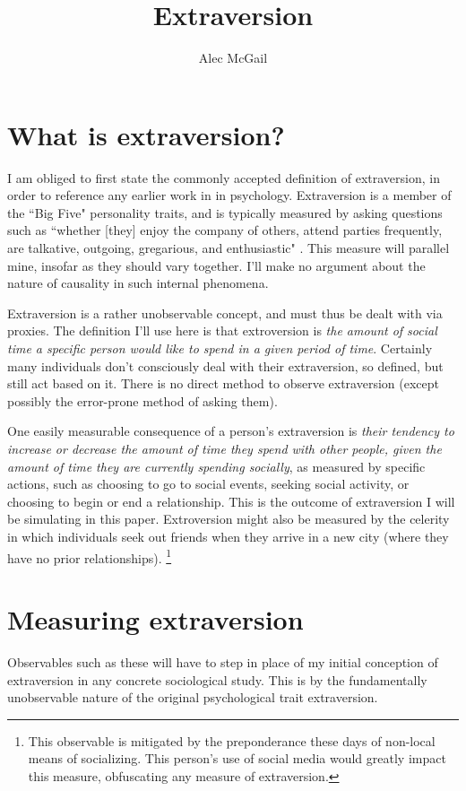 \documentclass[]{article}
\title{Extraversion}
\author{Alec McGail}
\begin{document}
	\maketitle
	
	\section{What is extraversion?}
	I am obliged to first state the commonly accepted definition of extraversion, in order to reference any earlier work in in psychology. Extraversion is a member of the ``Big Five" personality traits, and is typically measured by asking questions such as ``whether [they] enjoy the company of others, attend parties	frequently, are talkative, outgoing, gregarious, and enthusiastic" \cite{Gosling2003}. This measure will parallel mine, insofar as they should vary together. I'll make no argument about the nature of causality in such internal phenomena.
	
	Extraversion is a rather unobservable concept, and must thus be dealt with via proxies. The definition I'll use here is that extroversion is \textit{the amount of social time a specific person would like to spend in a given period of time}. Certainly many individuals don't consciously deal with their extraversion, so defined, but still act based on it. There is no direct method to observe extraversion (except possibly the error-prone method of asking them).
	
	One easily measurable consequence of a person's extraversion is \textit{their tendency to increase or decrease the amount of time they spend with other people, given the amount of time they are currently spending socially}, as measured by specific actions, such as choosing to go to social events, seeking social activity, or choosing to begin or end a relationship. This is the outcome of extraversion I will be simulating in this paper. Extroversion might also be measured by the celerity in which individuals seek out friends when they arrive in a new city (where they have no prior relationships).
	\footnote{This observable is mitigated by the preponderance these days of non-local means of socializing. This person's use of social media would greatly impact this measure, obfuscating any measure of extraversion.}
	
	\section{Measuring extraversion}
	Observables such as these will have to step in place of my initial conception of extraversion in any concrete sociological study.
	This is by the fundamentally unobservable nature of the original psychological trait extraversion.
\end{document}
